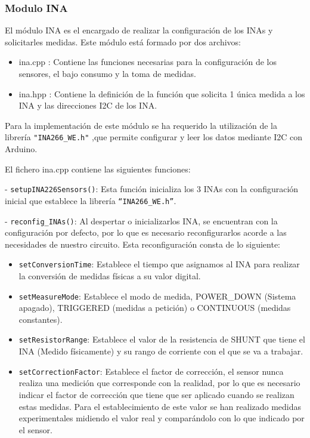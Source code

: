 \documentclass{article}
\begin{document}
\subsubsection{Modulo INA}

El módulo INA es el encargado de realizar la configuración de los INAs y solicitarles medidas.
Este módulo está formado por dos archivos:
\begin{itemize}
    \item ina.cpp : Contiene las funciones necesarias para la configuración de los sensores, el bajo consumo y la toma de medidas.
    \item ina.hpp : Contiene la definición de la función que solicita 1 única medida a los INA y las direcciones I2C de los INA.
\end{itemize}

Para la implementación de este módulo se ha requerido la utilización de la librería \texttt{"INA266\_WE.h"} ,que permite configurar y leer los datos mediante I2C con Arduino.

El fichero ina.cpp contiene las siguientes funciones:

- \texttt{setupINA226Sensors()}: Esta función inicializa los 3 INAs con la configuración inicial que establece la librería \texttt{“INA266\_WE.h”}.

- \texttt{reconfig\_INAs()}: Al despertar o inicializarlos INA, se encuentran con la configuración por defecto, por lo que es necesario reconfigurarlos acorde a las necesidades de nuestro circuito. Esta reconfiguración consta de lo siguiente:
\begin{itemize}
    \item \texttt{setConversionTime}: Establece el tiempo que asignamos al INA para realizar la conversión de medidas físicas a su valor digital.
    \item \texttt{setMeasureMode}: Establece el modo de medida, POWER\_DOWN (Sistema apagado), TRIGGERED (medidas a petición) o CONTINUOUS (medidas constantes).
    \item \texttt{setResistorRange}: Establece el valor de la resistencia de SHUNT que tiene el INA (Medido físicamente) y su rango de corriente con el que se va a trabajar.
    \item \texttt{setCorrectionFactor}: Establece el factor de corrección, el sensor nunca realiza una medición que corresponde con la realidad, por lo que es necesario indicar el factor de corrección que tiene que ser aplicado cuando se realizan estas medidas. Para el establecimiento de este valor se han realizado medidas experimentales midiendo el valor real y comparándolo con lo que indicado por el sensor.
\end{itemize}
\end{document}
